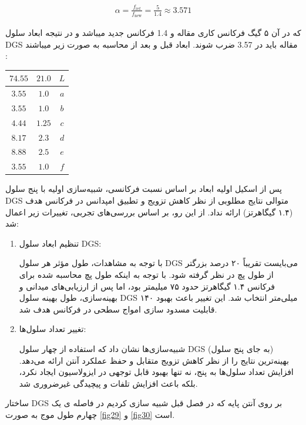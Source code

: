   \begin{align}
 	\label{eq:eq13}
 	\alpha = \frac{f_{\text{ref}}}{f_{\text{new}}} = \frac{5}{1.4} \approx 3.571
 \end{align}
 
 که در آن ۵ گیگ فرکانس کاری مقاله و 1.4 فرکانس جدید میباشد و در نتیجه ابعاد سلول DGS مقاله باید در 3.57 ضرب شوند.
 ابعاد قبل و بعد از محاسبه به صورت زیر میباشند : 
 \begin{center}
 \begin{tabular}{|c|c|c|}
 	\hline
 	$74.55$ & $21.0$ & $L$ \\
 	\hline
 	$3.55$ & $1.0$ & $a$ \\
 	\hline
 	$3.55$ & $1.0$ & $b$ \\
 	\hline
 	$4.44$ & $1.25$ & $c$ \\
 	\hline
 	$8.17$ & $2.3$ & $d$ \\
 	\hline
 	$8.88$ & $2.5$ & $e$ \\
 	\hline
 	$3.55$ & $1.0$ & $f$ \\
 	\hline
 \end{tabular}
 \end{center}
 
پس از اسکیل اولیه ابعاد بر اساس نسبت فرکانسی، شبیه‌سازی اولیه با پنج سلول DGS متوالی نتایج مطلوبی از نظر کاهش تزویج و تطبیق امپدانس در فرکانس هدف (۱.۴ گیگاهرتز) ارائه نداد. از این رو، بر اساس بررسی‌های تجربی، تغییرات زیر اعمال شد:
 \begin{enumerate}
 	\item{
 		تنظیم ابعاد سلول DGS:
 		
 		با توجه به مشاهدات، طول مؤثر هر سلول DGS می‌بایست تقریباً ۲۰ درصد بزرگتر از طول پچ  در نظر گرفته شود. با توجه به اینکه طول پچ محاسبه شده برای فرکانس ۱.۴ گیگاهرتز حدود ۷۵ میلیمتر بود، اما پس از ارزیابی‌های میدانی و بهینه‌سازی، طول بهینه سلول DGS ۱۴۰ میلی‌متر انتخاب شد. این تغییر باعث بهبود قابلیت مسدود سازی امواج سطحی در فرکانس هدف شد.
 		}
 	\item{
 	تغییر تعداد سلول‌ها:
 	
 	شبیه‌سازی‌ها نشان داد که استفاده از چهار سلول DGS (به جای پنج سلول) بهینه‌ترین نتایج را از نظر کاهش تزویج متقابل و حفظ عملکرد آنتن ارائه می‌دهد. افزایش تعداد سلول‌ها به پنج، نه تنها بهبود قابل توجهی در ایزولاسیون ایجاد نکرد، بلکه باعث افزایش تلفات و پیچیدگی غیرضروری شد.
 	}
 \end{enumerate}
 
 ساختار DGS بر روی آنتن پایه که در فصل قبل شبیه سازی کردیم در فاصله ی یک چهارم طول موج به صورت 
 \ref{fig29}
 و
 \ref{fig30}
  است.
  

